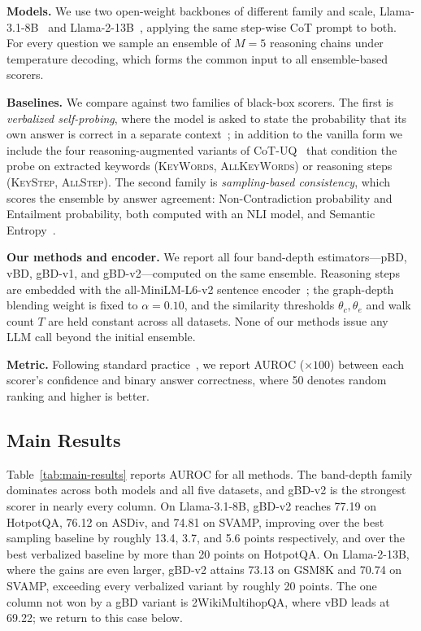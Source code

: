 \documentclass[11pt]{article}
\begin{document}
\textbf{Models.} We use two open-weight backbones of different family and scale,
Llama-3.1-8B~\citep{grattafiori2024llama3} and
Llama-2-13B~\citep{touvron2023llama2}, applying the same step-wise CoT prompt to
both. For every question we sample an ensemble of $M = 5$ reasoning chains under
temperature decoding, which forms the common input to all ensemble-based scorers.

\textbf{Baselines.} We compare against two families of black-box scorers. The
first is \emph{verbalized self-probing}, where the model is asked to state the
probability that its own answer is correct in a separate
context~\citep{xiong2024llms}; in addition to the vanilla form we include the
four reasoning-augmented variants of CoT-UQ~\citep{zhang2025cotuq} that condition
the probe on extracted keywords (\textsc{KeyWords}, \textsc{AllKeyWords}) or
reasoning steps (\textsc{KeyStep}, \textsc{AllStep}). The second family is
\emph{sampling-based consistency}, which scores the ensemble by answer agreement:
Non-Contradiction probability and Entailment probability, both computed with an
NLI model, and Semantic Entropy~\citep{kuhn2023semantic, farquhar2024detecting}.

\textbf{Our methods and encoder.} We report all four band-depth estimators---pBD,
vBD, gBD-v1, and gBD-v2---computed on the same ensemble. Reasoning steps are
embedded with the all-MiniLM-L6-v2 sentence encoder~\citep{reimers2019sentencebert};
the graph-depth blending weight is fixed to $\alpha = 0.10$, and the similarity
thresholds $\theta_c, \theta_e$ and walk count $T$ are held constant across all
datasets. None of our methods issue any LLM call beyond the initial ensemble.

\textbf{Metric.} Following standard practice~\citep{kuhn2023semantic, xiong2024llms},
we report AUROC ($\times 100$) between each scorer's confidence and binary answer
correctness, where 50 denotes random ranking and higher is better.

\subsection{Main Results}
\label{sec:exp:main}

Table~\ref{tab:main-results} reports AUROC for all methods. The band-depth family
dominates across both models and all five datasets, and gBD-v2 is the strongest
scorer in nearly every column. On Llama-3.1-8B, gBD-v2 reaches 77.19 on HotpotQA,
76.12 on ASDiv, and 74.81 on SVAMP, improving over the best sampling baseline by
roughly 13.4, 3.7, and 5.6 points respectively, and over the best verbalized
baseline by more than 20 points on HotpotQA. On Llama-2-13B, where the gains are
even larger, gBD-v2 attains 73.13 on GSM8K and 70.74 on SVAMP, exceeding every
verbalized variant by roughly 20 points. The one column not won by a gBD variant
is 2WikiMultihopQA, where vBD leads at 69.22; we return to this case below.
\end{document}
